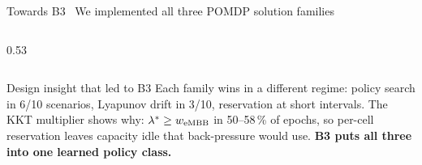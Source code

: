 \documentclass[aspectratio=169,10pt,xcolor={table,dvipsnames}]{beamer}
\begin{document}
\begin{frame}{Towards B3 \textbullet\ We implemented all three POMDP solution families}
\begin{columns}[T]
\begin{column}{0.53\textwidth}
\begin{tabular}{lcccc}
\bottomrule
\end{tabular}
\vspace{0.4em}
\begin{exampleblock}{Design insight that led to B3}
\footnotesize Each family wins in a different regime: policy search in 6/10 scenarios, Lyapunov drift in 3/10, reservation at short intervals. The KKT multiplier shows why: $\lambda^\ast \ge w_{\rm eMBB}$ in 50--58\,\% of epochs, so per-cell reservation leaves capacity idle that back-pressure would use. \textbf{B3 puts all three into one learned policy class.}
\end{exampleblock}
\end{column}
\end{columns}
\end{frame}

\end{document}
